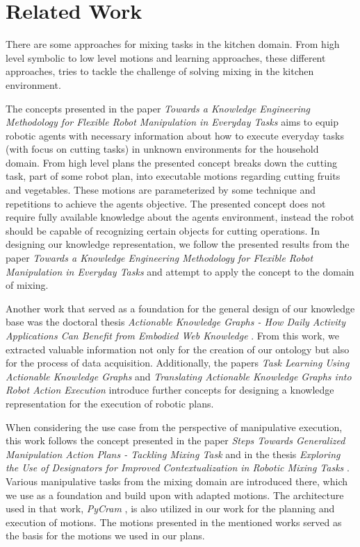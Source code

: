 \chapter{Related Work}
\label{chap:Related_work}
There are some approaches for mixing tasks in the kitchen domain. From high level symbolic to low level motions and 
learning approaches, these different approaches, tries to tackle the challenge of solving mixing in the kitchen environment.

The concepts presented in the paper \textit{Towards a Knowledge Engineering Methodology for
Flexible Robot Manipulation in Everyday Tasks} \cite{kuempel2024methodology} aims to equip robotic agents with necessary information about how to 
execute  everyday tasks (with focus on cutting tasks) in unknown environments for the household domain. From high level plans the presented concept breaks down 
the cutting task, part of some robot plan, into executable motions regarding cutting fruits and vegetables. These motions are parameterized 
by some technique and repetitions to achieve the agents objective. 
The presented concept does not require fully available knowledge
about the agents environment, instead the robot should be capable of recognizing certain objects for cutting 
operations. In designing our knowledge representation, we follow the presented results from the paper \textit{Towards a Knowledge Engineering Methodology for Flexible Robot Manipulation in Everyday Tasks}  \cite{kuempel2024methodology} and attempt to apply the concept to the domain of mixing.

Another work that served as a foundation for the general design of our knowledge base was the doctoral thesis 
\textit{Actionable Knowledge Graphs - How Daily Activity Applications Can Benefit from Embodied Web Knowledge} \cite{elib_7861} . 
From this work, we extracted valuable information not only for the creation of our ontology but also for the process 
of data acquisition. Additionally, the papers \textit{Task Learning Using Actionable Knowledge Graphs} \cite{kuempel2024akgtasklearning} and 
\textit{Translating Actionable Knowledge Graphs into Robot Action Execution} \cite{kuempel2024HHAItutorial} introduce further concepts for designing a 
knowledge representation for the execution of robotic plans.

When considering the use case from the perspective of manipulative execution, this work follows the concept presented in the paper 
\textit{Steps Towards Generalized Manipulation Action Plans - Tackling Mixing Task} \cite{Hassouna2024AKR} and in the thesis 
\textit{Exploring the Use of Designators for Improved Contextualization in Robotic Mixing Tasks} \cite{Van2023}. Various manipulative tasks from the mixing domain are 
introduced there, which we use as a foundation and build upon with adapted motions. The architecture used in that work, \textit{PyCram} \cite{pycram}, 
is also utilized in our work for the planning and execution of motions. The motions presented in the mentioned works served as the basis for the motions we used in our plans.


